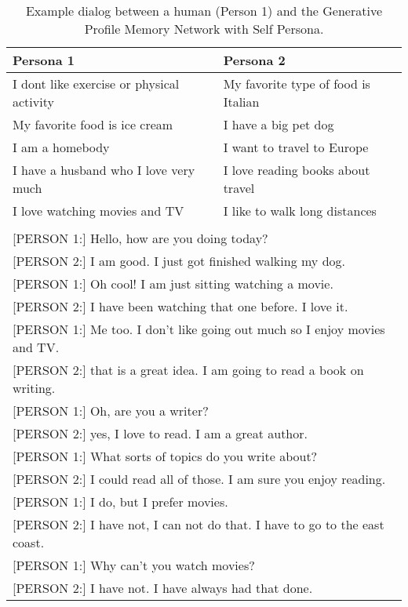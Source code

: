 \documentclass[11pt,a4paper]{article}
\begin{document}
\begin{table*}[t]
  \begin{center}
    \begin{small}
      \begin{tabular}{l|l}
        \toprule
        \textbf{Persona 1} & \textbf{Persona 2}\\
        \midrule
I dont like exercise or physical activity & My favorite type of food is Italian \\ 
My favorite food is ice cream & I have a big pet dog\\
I am a homebody &  I want to travel to Europe \\
 I have a husband who I love very much & I love reading books about travel \\
I love watching movies and TV& I like to walk long distances \\
\bottomrule
\multicolumn{2}{l}{ }\\
\multicolumn{2}{l}{[PERSON 1:] Hello, how are you doing today?}\\
\multicolumn{2}{l}{[PERSON 2:] I am good. I just got finished walking my dog.}\\
\multicolumn{2}{l}{[PERSON 1:] Oh cool! I am just sitting watching a movie. }\\
\multicolumn{2}{l}{[PERSON 2:] I have been watching that one before. I love it.}\\
\multicolumn{2}{l}{[PERSON 1:] Me too. I don't like going out much so I enjoy movies and TV.}\\
\multicolumn{2}{l}{[PERSON 2:] that is a great idea. I am going to read a book on writing.}\\
\multicolumn{2}{l}{[PERSON 1:] Oh, are you a writer?}\\
\multicolumn{2}{l}{[PERSON 2:] yes, I love to read. I am a great author.}\\
\multicolumn{2}{l}{[PERSON 1:] What sorts of topics do you write about?}\\
\multicolumn{2}{l}{[PERSON 2:] I could read all of those. I am sure you enjoy reading.}\\
\multicolumn{2}{l}{[PERSON 1:] I do, but I prefer movies.}\\
\multicolumn{2}{l}{[PERSON 2:] I have not, I can not do that. I have to go to the east coast.}\\
\multicolumn{2}{l}{[PERSON 1:] Why can't you watch movies?}\\
\multicolumn{2}{l}{[PERSON 2:] I have not. I have always had that done.}\\
      \end{tabular}
      \caption{Example dialog between a human (Person 1) and the Generative Profile Memory Network with Self Persona. \label{table:gpm-example}}
    \end{small}
  \end{center}
\end{table*}
\end{document}
